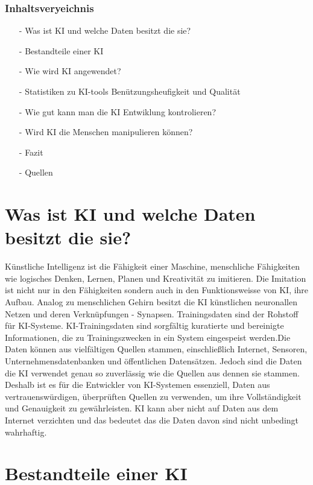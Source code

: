 \documentclass{report}
\begin{document}
\subsection{Inhaltsveryeichnis}

\begin{itemize}
\item[-] Was ist KI und welche Daten besitzt die sie?
\item[-] Bestandteile einer KI
\item[-] Wie wird KI angewendet?
\item[-] Statistiken zu KI-tools Benützungsheufigkeit und Qualität
\item[-] Wie gut kann man die KI Entwiklung kontrolieren?
\item[-] Wird KI die Menschen manipulieren können?
\item[-] Fazit
\item[-] Quellen 


\end{itemize}

\chapter{Was ist KI und welche Daten besitzt die sie?}

Künstliche Intelligenz ist die Fähigkeit einer Maschine, menschliche Fähigkeiten wie logisches Denken, 
Lernen, Planen und Kreativität zu imitieren. Die Imitation ist nicht nur in den Fähigkeiten sondern auch in den 
Funktionsweisse von KI, ihre Aufbau. Analog zu menschlichen Gehirn besitzt die KI künstlichen neuronallen Netzen und 
deren Verknüpfungen - Synapsen. Trainingsdaten sind der Rohstoff für KI-Systeme. KI-Trainingsdaten sind sorgfältig kuratierte und bereinigte Informationen,
 die zu Trainingszwecken in ein System eingespeist werden.Die Daten können aus vielfältigen Quellen stammen, einschließlich Internet, Sensoren,
  Unternehmensdatenbanken und öffentlichen Datensätzen. Jedoch sind die Daten die KI verwendet genau so zuverlässig wie die Quellen aus dennen sie stammen.
  Deshalb ist es für die Entwickler von KI-Systemen essenziell, Daten aus vertrauenswürdigen, überprüften Quellen zu verwenden,
   um ihre Vollständigkeit und Genauigkeit zu gewährleisten. KI kann aber nicht auf Daten aus dem Internet verzichten und das bedeutet das die Daten 
   davon sind nicht unbedingt wahrhaftig. 

   \chapter{Bestandteile einer KI}
 
\end{document}
